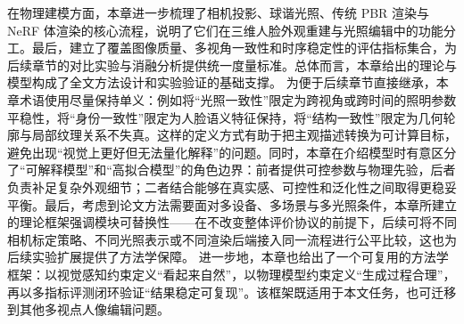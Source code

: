 在物理建模方面，本章进一步梳理了相机投影、球谐光照、传统 PBR 渲染与 NeRF 体渲染的核心流程，说明了它们在三维人脸外观重建与光照编辑中的功能分工。最后，建立了覆盖图像质量、多视角一致性和时序稳定性的评估指标集合，为后续章节的对比实验与消融分析提供统一度量标准。总体而言，本章给出的理论与模型构成了全文方法设计和实验验证的基础支撑。
为便于后续章节直接继承，本章术语使用尽量保持单义：例如将“光照一致性”限定为跨视角或跨时间的照明参数平稳性，将“身份一致性”限定为人脸语义特征保持，将“结构一致性”限定为几何轮廓与局部纹理关系不失真。这样的定义方式有助于把主观描述转换为可计算目标，避免出现“视觉上更好但无法量化解释”的问题。同时，本章在介绍模型时有意区分了“可解释模型”和“高拟合模型”的角色边界：前者提供可控参数与物理先验，后者负责补足复杂外观细节；二者结合能够在真实感、可控性和泛化性之间取得更稳妥平衡。最后，考虑到论文方法需要面对多设备、多场景与多光照条件，本章所建立的理论框架强调模块可替换性——在不改变整体评价协议的前提下，后续可将不同相机标定策略、不同光照表示或不同渲染后端接入同一流程进行公平比较，这也为后续实验扩展提供了方法学保障。
进一步地，本章也给出了一个可复用的方法学框架：以视觉感知约束定义“看起来自然”，以物理模型约束定义“生成过程合理”，再以多指标评测闭环验证“结果稳定可复现”。该框架既适用于本文任务，也可迁移到其他多视点人像编辑问题。




















